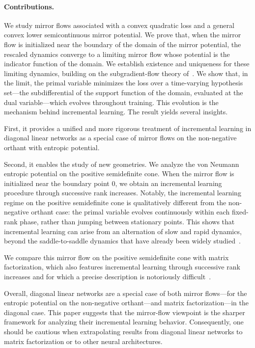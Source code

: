 \documentclass[11pt,english,reqno]{article}
\theoremstyle{plain}
\theoremstyle{definition}
\theoremstyle{remark}
\numberwithin{equation}{section}
\begin{document}
\paragraph*{Contributions.} 

We study mirror flows associated with a convex quadratic loss and a general convex lower semicontinuous mirror potential. We prove that, when the mirror flow is initialized near the boundary of the domain of the mirror potential, the rescaled dynamics converge to a limiting mirror flow whose potential is the indicator function of the domain. We establish existence and uniqueness for these limiting dynamics, building on the subgradient-flow theory of~\cite{brezis1973ope}. We show that, in the limit, the primal variable minimizes the loss over a time-varying hypothesis set---the subdifferential of the support function of the domain, evaluated at the dual variable---which evolves throughout training. This evolution is the mechanism behind incremental learning. The result yields several insights.

First, it provides a unified and more rigorous treatment of incremental learning in diagonal linear networks as a special case of mirror flows on the non-negative orthant with entropic potential.

Second, it enables the study of new geometries. We analyze the von Neumann entropic potential on the positive semidefinite cone. When the mirror flow is initialized near the boundary point $0$, we obtain an incremental learning procedure through successive rank increases. Notably, the incremental learning regime on the positive semidefinite cone is qualitatively different from the non-negative orthant case: the primal variable evolves continuously within each fixed-rank phase, rather than jumping between stationary points. This shows that incremental learning can arise from an alternation of slow and rapid dynamics, beyond the saddle-to-saddle dynamics that have already been widely studied~\cite{jacot2021saddle,li2020towards}.

We compare this mirror flow on the positive semidefinite cone with matrix factorization, which also features incremental learning through successive rank increases and for which a precise description is notoriously difficult~\cite{li2020towards,gunasekar2017implicit,arora2019implicit,razin2020implicit}.

Overall, diagonal linear networks are a special case of both mirror flows---for the entropic potential on the non-negative orthant---and matrix factorization---in the diagonal case. This paper suggests that the mirror-flow viewpoint is the sharper framework for analyzing their incremental learning behavior. Consequently, one should be cautious when extrapolating results from diagonal linear networks to matrix factorization or to other neural architectures.
\end{document}
